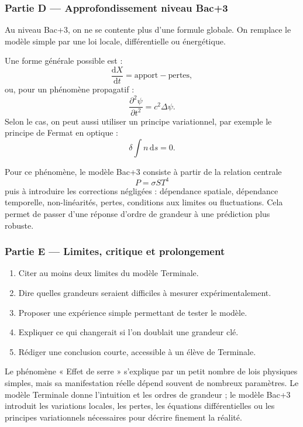 \documentclass[11pt,a4paper]{article}
\begin{document}
\subsubsection*{Partie D — Approfondissement niveau Bac+3}

\begin{approfondissementbox}
Au niveau Bac+3, on ne se contente plus d'une formule globale. On remplace le modèle simple par une loi locale, différentielle ou énergétique.

Une forme générale possible est :
\[
\frac{\mathrm d X}{\mathrm dt}=\text{apport}-\text{pertes},
\]
ou, pour un phénomène propagatif :
\[
\frac{\partial^2 \psi}{\partial t^2}=c^2\Delta\psi.
\]
Selon le cas, on peut aussi utiliser un principe variationnel, par exemple le principe de Fermat en optique :
\[
\delta \int n\,\mathrm ds=0.
\]

Pour ce phénomène, le modèle Bac+3 consiste à partir de la relation centrale
\[
P=\sigma S T^4
\]
puis à introduire les corrections négligées : dépendance spatiale, dépendance temporelle, non-linéarités, pertes, conditions aux limites ou fluctuations. Cela permet de passer d'une réponse d'ordre de grandeur à une prédiction plus robuste.
\end{approfondissementbox}

\subsubsection*{Partie E — Limites, critique et prolongement}

\begin{enumerate}
  \item Citer au moins deux limites du modèle Terminale.
  \item Dire quelles grandeurs seraient difficiles à mesurer expérimentalement.
  \item Proposer une expérience simple permettant de tester le modèle.
  \item Expliquer ce qui changerait si l'on doublait une grandeur clé.
  \item Rédiger une conclusion courte, accessible à un élève de Terminale.
\end{enumerate}

\begin{corrigebox}
Le phénomène « Effet de serre » s'explique par un petit nombre de lois physiques simples, mais sa manifestation réelle dépend souvent de nombreux paramètres. Le modèle Terminale donne l'intuition et les ordres de grandeur ; le modèle Bac+3 introduit les variations locales, les pertes, les équations différentielles ou les principes variationnels nécessaires pour décrire finement la réalité.
\end{corrigebox}
\end{document}
